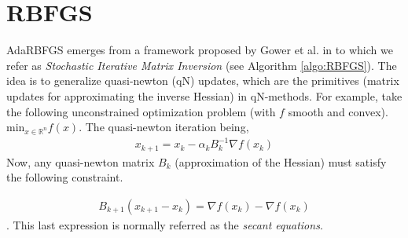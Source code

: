 \documentclass[12pt,conference,compsocconf]{IEEEtran}
\newcommand{\R}{\mathbb{R}}
\begin{document}
\section{RBFGS}\label{sect:rbfgs}
AdaRBFGS emerges from a framework proposed by Gower et al. in \cite{Gower1,Gower2} to which we refer as \textit{Stochastic Iterative Matrix Inversion} (see Algorithm \ref{algo:RBFGS}). The idea is to generalize quasi-newton (qN) updates, which are the primitives (matrix updates for approximating the inverse Hessian) in qN-methods. For example, take the following unconstrained optimization problem (with $f$ smooth and convex).
$\text{min}_{x \in \R^n} f(x)$. The quasi-newton iteration being, 
\begin{align}\label{eq:qnmethod}
x_{k+1}=x_k-\alpha_kB_k^{-1}\nabla f(x_k)
\end{align}
Now, any quasi-newton matrix $B_k$ (approximation of the Hessian) must satisfy the following constraint.

\begin{align}\label{eq:secant}
B_{k+1}(x_{k+1}-x_k)=\nabla f(x_k)-\nabla f(x_k)
\end{align}
. This last expression is normally referred as the \textit{secant equations}.
\vspace{-4mm}
\end{document}
